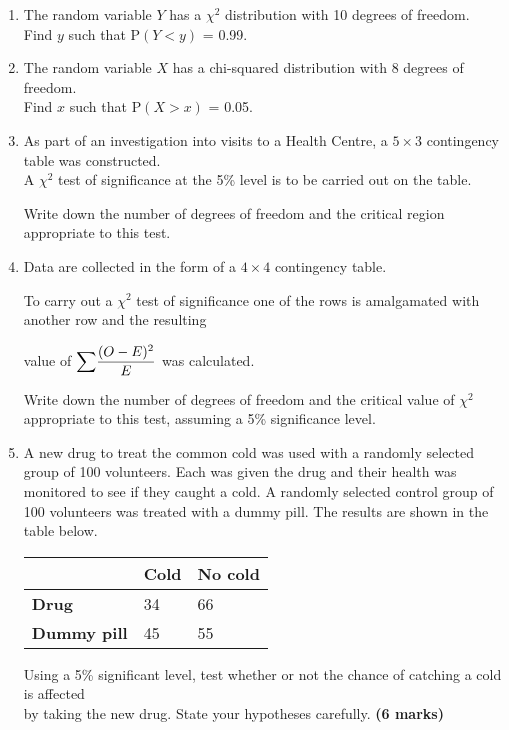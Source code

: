 \documentclass[fleqn]{article}
\begin{document}
\newpage
{}
\begin{enumerate}
    \setlength\itemsep{0.5em}
    \item The random variable $Y$ has a $\chi^2$ distribution with 10 degrees of freedom. \\
        Find $y$ such that P$(Y<y)$ = 0.99.

    \item The random variable $X$ has a chi-squared distribution with 8 degrees of freedom. \\
        Find $x$ such that P$(X>x)$ = 0.05.

    \item As part of an investigation into visits to a Health Centre, a $5 \times 3$ contingency table was constructed. \\
        A $\chi^2$ test of significance at the 5\% level is to be carried out on the table. 
        
        Write down the number of degrees of freedom and the critical region appropriate to this test.
        
    \item Data are collected in the form of a $4 \times 4$ contingency table.\par
        To carry out a $\chi^2$ test of significance one of the rows is amalgamated with another row and the resulting \par value of ${\mathlarger\sum}\dfrac{(O-E)^{2}}{E}$ was calculated.
        
        Write down the number of degrees of freedom and the critical value of $\chi^2$ appropriate to this test, assuming a 5\% significance level.
    
    \item A new drug to treat the common cold was used with a randomly selected group of 100 volunteers. Each was given the drug and their health was monitored to see if they caught a cold. A randomly selected control group of 100 volunteers was treated with a dummy pill. The results are shown in the table below.
        \begin{center}
            \begin{minipage}[t]{0.45\linewidth}
                \begin{tabularx}{\textwidth}{|X|*2{P{20mm}|}}
                      & \textbf{Cold} & \textbf{No cold}      \\\hline
                    \textbf{Drug}          & 34            & 66                    \\\hline
                    \textbf{Dummy pill}    & 45            & 55                    \\\hline
                \end{tabularx}
                \vspace{3mm}
            \end{minipage}
        \end{center}
        Using a 5\% significant level, test whether or not the chance of catching a cold is affected \\by taking the new drug. State your hypotheses carefully. \hfill\textbf{(6 marks)}
        

\end{enumerate}
\end{document}
